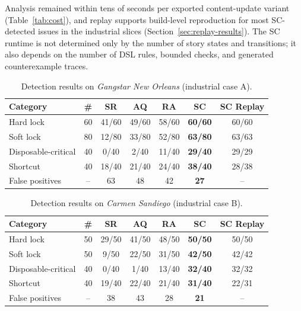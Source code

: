 \documentclass[conference]{IEEEtran}
\begin{document}
Analysis remained within tens of seconds per exported content-update
variant (Table~\ref{tab:cost}), and replay supports build-level
reproduction for most SC-detected issues in the industrial slices
(Section~\ref{sec:replay-results}). The SC runtime is not determined only
by the number of story states and transitions; it also depends on the
number of DSL rules, bounded checks, and generated counterexample traces.

\begin{table}[t]
  \caption{Detection results on \emph{Gangstar New Orleans} (industrial case A).}
  \label{tab:results-gno}
  \centering
  \scriptsize
  \setlength{\tabcolsep}{3pt}
  \begin{tabular}{lcccccc}
    \toprule
    Category & \# & SR & AQ & RA & \textbf{SC} & SC Replay \\
    \midrule
    Hard lock           & 60 & 41/60 & 49/60 & 58/60 & \textbf{60/60} & 60/60 \\
    Soft lock           & 80 & 12/80 & 33/80 & 52/80 & \textbf{63/80} & 63/63 \\
    Disposable-critical & 40 & 0/40  & 2/40  & 11/40 & \textbf{29/40} & 29/29 \\
    Shortcut            & 40 & 18/40 & 21/40 & 24/40 & \textbf{38/40} & 28/38 \\
    \midrule
    False positives     & -- & 63    & 48    & 42    & \textbf{27}    & --    \\
    \bottomrule
  \end{tabular}
\end{table}

\begin{table}[t]
  \caption{Detection results on \emph{Carmen Sandiego} (industrial case B).}
  \label{tab:results-carmen}
  \centering
  \scriptsize
  \setlength{\tabcolsep}{3pt}
  \begin{tabular}{lcccccc}
    \toprule
    Category & \# & SR & AQ & RA & \textbf{SC} & SC Replay \\
    \midrule
    Hard lock           & 50 & 29/50 & 41/50 & 48/50 & \textbf{50/50} & 50/50 \\
    Soft lock           & 50 & 9/50  & 22/50 & 31/50 & \textbf{42/50} & 42/42 \\
    Disposable-critical & 40 & 0/40  & 1/40  & 13/40 & \textbf{32/40} & 32/32 \\
    Shortcut            & 40 & 19/40 & 22/40 & 21/40 & \textbf{31/40} & 22/31 \\
    \midrule
    False positives     & -- & 38    & 43    & 28    & \textbf{21}    & --    \\
    \bottomrule
  \end{tabular}
\end{table}
\end{document}
